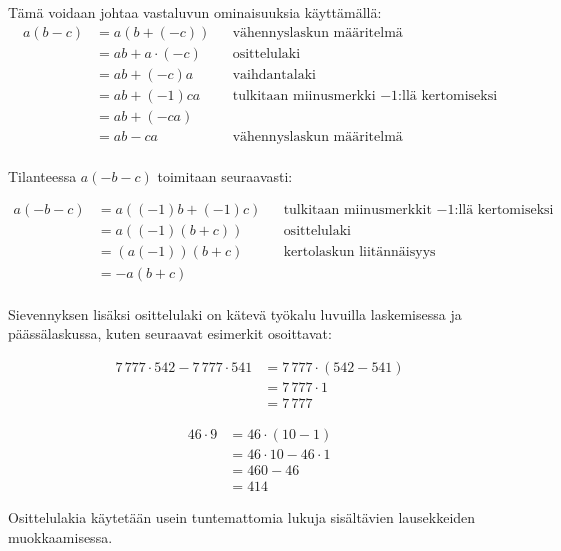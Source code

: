 Tämä voidaan johtaa vastaluvun ominaisuuksia käyttämällä:
\begin{align*}
	a(b-c)
	&=a(b+(-c)) && \text{vähennyslaskun määritelmä} \\
	&=ab+a\cdot (-c) && \text{osittelulaki} \\
	&=ab+ (-c)a && \text{vaihdantalaki} \\
	&=ab+ (-1)ca && \text{tulkitaan miinusmerkki $-1$:llä kertomiseksi} \\
	&=ab+ (-ca)&& \text{} \\
	&=ab-ca && \text{vähennyslaskun määritelmä} \\
	\end{align*}	
	
Tilanteessa $a(-b-c)$ toimitaan seuraavasti:

\begin{align*}
	a(-b-c)
	&=a((-1)b+(-1)c) && \text{tulkitaan miinusmerkkit $-1$:llä kertomiseksi} \\
	&=a((-1)(b+c)) && \text{osittelulaki} \\
	&=(a(-1))(b+c) && \text{kertolaskun liitännäisyys} \\
	&=-a(b+c) && \text{} \\
	\end{align*}	

Sievennyksen lisäksi osittelulaki on kätevä työkalu luvuilla laskemisessa ja päässälaskussa, kuten seuraavat esimerkit osoittavat:

\begin{esimerkki}
     \begin{align*}
7\,777\cdot 542-7\,777\cdot 541 &= 7\,777\cdot (542-541) \\ &= 7\,777\cdot 1 \\ &= 7\,777
     \end{align*}
\end{esimerkki}

\begin{esimerkki}
    \begin{align*}
46\cdot 9 &= 46\cdot (10-1) \\ &= 46\cdot 10 - 46\cdot 1 \\ &= 460-46 \\ &= 414
    \end{align*}
\end{esimerkki}

Osittelulakia käytetään usein tuntemattomia lukuja sisältävien lausekkeiden muokkaamisessa.

\begin{esimerkki}
\end{esimerkki}

